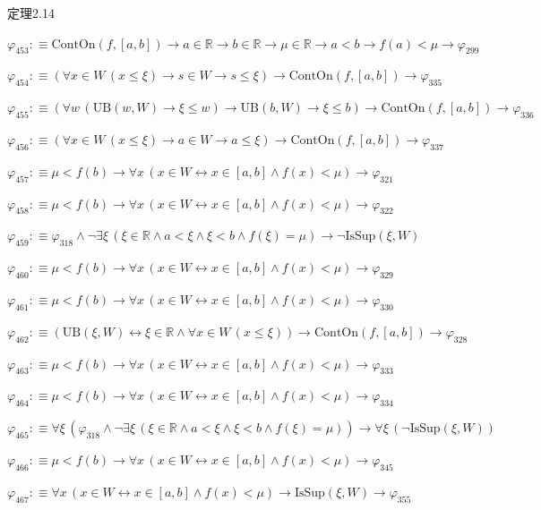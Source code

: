 \begin{fullproof}{定理2.14}
\begin{abbrevlist}
\item $\varphi_{453} :\equiv \mathrm{ContOn}(f,[a,b]) \to a \in \mathbb{R} \to b \in \mathbb{R} \to \mu \in \mathbb{R} \to a < b \to f(a) < \mu \to \varphi_{299}$
\item $\varphi_{454} :\equiv (\forall x \in W\,(x \leq \xi) \to s \in W \to s \leq \xi) \to \mathrm{ContOn}(f,[a,b]) \to \varphi_{335}$
\item $\varphi_{455} :\equiv (\forall w\,(\mathrm{UB}(w,W) \to \xi \leq w) \to \mathrm{UB}(b,W) \to \xi \leq b) \to \mathrm{ContOn}(f,[a,b]) \to \varphi_{336}$
\item $\varphi_{456} :\equiv (\forall x \in W\,(x \leq \xi) \to a \in W \to a \leq \xi) \to \mathrm{ContOn}(f,[a,b]) \to \varphi_{337}$
\item $\varphi_{457} :\equiv \mu < f(b) \to \forall x\,(x \in W \leftrightarrow x \in [a,b] \land f(x) < \mu) \to \varphi_{321}$
\item $\varphi_{458} :\equiv \mu < f(b) \to \forall x\,(x \in W \leftrightarrow x \in [a,b] \land f(x) < \mu) \to \varphi_{322}$
\item $\varphi_{459} :\equiv \varphi_{318} \land \neg \exists \xi\,(\xi \in \mathbb{R} \land a < \xi \land \xi < b \land f(\xi) = \mu) \to \neg \mathrm{IsSup}(\xi,W)$
\item $\varphi_{460} :\equiv \mu < f(b) \to \forall x\,(x \in W \leftrightarrow x \in [a,b] \land f(x) < \mu) \to \varphi_{329}$
\item $\varphi_{461} :\equiv \mu < f(b) \to \forall x\,(x \in W \leftrightarrow x \in [a,b] \land f(x) < \mu) \to \varphi_{330}$
\item $\varphi_{462} :\equiv (\mathrm{UB}(\xi,W) \leftrightarrow \xi \in \mathbb{R} \land \forall x \in W\,(x \leq \xi)) \to \mathrm{ContOn}(f,[a,b]) \to \varphi_{328}$
\item $\varphi_{463} :\equiv \mu < f(b) \to \forall x\,(x \in W \leftrightarrow x \in [a,b] \land f(x) < \mu) \to \varphi_{333}$
\item $\varphi_{464} :\equiv \mu < f(b) \to \forall x\,(x \in W \leftrightarrow x \in [a,b] \land f(x) < \mu) \to \varphi_{334}$
\item $\varphi_{465} :\equiv \forall \xi\,(\varphi_{318} \land \neg \exists \xi\,(\xi \in \mathbb{R} \land a < \xi \land \xi < b \land f(\xi) = \mu)) \to \forall \xi\,(\neg \mathrm{IsSup}(\xi,W))$
\item $\varphi_{466} :\equiv \mu < f(b) \to \forall x\,(x \in W \leftrightarrow x \in [a,b] \land f(x) < \mu) \to \varphi_{345}$
\item $\varphi_{467} :\equiv \forall x\,(x \in W \leftrightarrow x \in [a,b] \land f(x) < \mu) \to \mathrm{IsSup}(\xi,W) \to \varphi_{355}$

\end{abbrevlist}
\end{fullproof}

